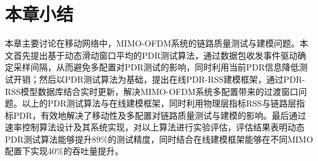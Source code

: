 \section{本章小结}
\label{sec:conclusion3}

本章主要讨论在移动网络中，MIMO-OFDM系统的链路质量测试与建模问题。本文首先提出基于动态滑动窗口平均的PDR测试算法，通过数据包收发事件驱动确定采样间隔，从而避免多配置对PDR测试的影响，同时利用当前PDR信息降低测试开销；然后以PDR测试算法为基础，提出在线PDR-RSS建模框架，通过PDR-RSS模型数据库结合实时更新，解决MIMO-OFDM系统多配置带来的过渡窗口问题。以上的PDR测试算法与在线建模框架，同时利用物理层指标RSS与链路层指标PDR，有效地解决了移动性及多配置对链路质量测试与建模的影响。最后通过速率控制算法设计及其系统实现，对以上算法进行实验评估，评估结果表明动态PDR测试算法能够提升89\%的测试精度，同时结合在线建模框架能够在不同MIMO配置下实现40\%的吞吐量提升。


\nocite{10.1109/TMC.2009.87,Ahmed2008Online,Deek:2011,dujovne2010taxonomy,hiertz2010802.11,kim2006accurate,kim2009experimental,kolar2011mesh}
\nocite{Pelechrinis2010high,perahia2008next,sevani2012sir,zhang2008practical,Zhao2003delivery}

\nocite{Balan:2012:AHD:2348543.2348552,Bhartia:2011:HFD:2030613.2030642,Chai:2012:BES:2348543.2348564,Gollakota:2011:CRS:2018436.2018456}
\nocite{Gudipati:2011:SAR:2018436.2018455,Magistretti:2011:WRW:2030613.2030619,Magistretti:2010:IML:1859995.1860030,Manweiler:2011:ARH:1999995.2000020}
\nocite{Nguyen:2011:OCD:2030613.2030624,Qian:2011:PRU:1999995.2000026,Rozner:2010:NNP:1814433.1814445,Sanadhya:2012:ACI:2348543.2348565}
